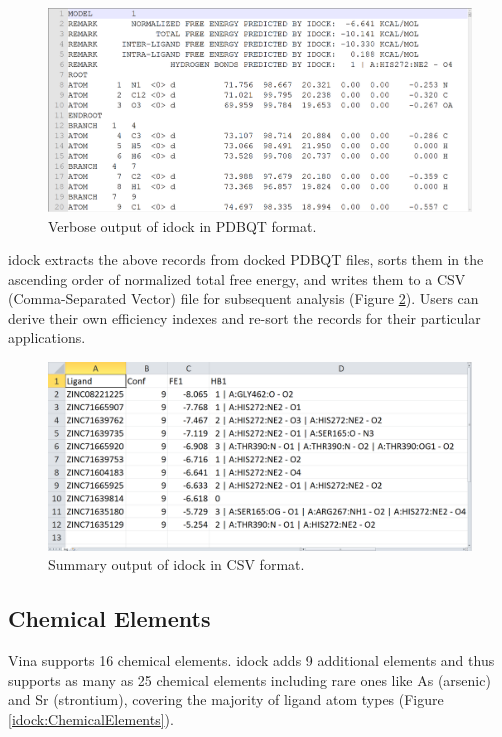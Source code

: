 \begin{figure}
\centering
\includegraphics[width=\textwidth]{idock/OutputPDBQT.png}
\caption{Verbose output of idock in PDBQT format.}
\label{idock:OutputPDBQT}
\end{figure}

idock extracts the above records from docked PDBQT files, sorts them in the ascending order of normalized total free energy, and writes them to a CSV (Comma-Separated Vector) file for subsequent analysis (Figure \ref{idock:OutputCSV}). Users can derive their own efficiency indexes \citep{335,336,337} and re-sort the records for their particular applications.

\begin{figure}
\centering
\includegraphics[width=\textwidth]{idock/OutputCSV.png}
\caption{Summary output of idock in CSV format.}
\label{idock:OutputCSV}
\end{figure}

\subsection{Chemical Elements}

Vina supports 16 chemical elements. idock adds 9 additional elements and thus supports as many as 25 chemical elements including rare ones like As (arsenic) and Sr (strontium), covering the majority of ligand atom types (Figure \ref{idock:ChemicalElements}).

